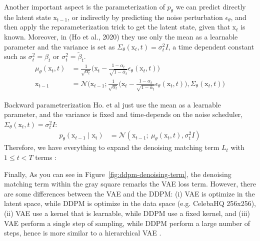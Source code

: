 \noindent {} Another important aspect is the parameterization of $p_{\theta}$ we can predict directly the latent state $\mathrm{x}_{t-1}$, or indirectly by predicting the noise perturbation $\epsilon_{\theta}$, and then apply the reparameterization trick to get the latent state, given that $\mathrm{x}_{t}$ is known. Moreover,
in (Ho et al., 2020) \cite{ho2020denoising} they use only the mean as a learnable parameter and the variance is set as $\Sigma_{\theta}(\mathrm{x}_{t}, t)=\sigma_{t}^2I$, a time dependent constant such as $\sigma_{t}^{2}=\beta_{t}$ or $\sigma_{t}^{2}=\tilde{\beta}_{t}$.
\begin{align}\label{eqn:backward-noise-reparameterization}
    \mu_{\theta}(\mathrm{x}_{t}, t) &= \frac{1}{\sqrt{\alpha_{t}}}\big(\mathrm{x}_{t} - \frac{1-\alpha_{t}}{\sqrt{1-\bar{\alpha}_{t}}}\epsilon_{\theta}(\mathrm{x}_{t}, t)\big) \\
    \mathrm{x}_{t-1} &= \mathcal{N}\big(\mathrm{x}_{t-1}; \frac{1}{\sqrt{\alpha_{t}}}\big(\mathrm{x}_{t} - \frac{1-\alpha_{t}}{\sqrt{1-\bar{\alpha}_{t}}}\epsilon_{\theta}(\mathrm{x}_{t}, t)\big), \Sigma_{\theta}(\mathrm{x}_{t}, t)\big)
\end{align}

Backward parametrerization Ho. et al just use the mean as a learnable parameter, and the variance is fixed and time-depends on the noise scheduler, 
$\Sigma_{\theta}(\mathrm{x}_{t}, t) = \sigma_{t}^{2}I$:
\begin{align}\label{eqn:backward-process-fix-variance}
    p_{\theta}(\mathrm{x}_{t-1}\mid\mathrm{x_{t}}) &= \mathcal{N}(\mathrm{x}_{t-1};~\mu_{\theta}(\mathrm{x}_{t}, t), \sigma_{t}^{2}I)
\end{align}
Therefore, we have everything to expand the denoising matching term $L_t$ with $1\leq t < T$ terms :

\noindent {} Finally, As you can see in Figure~\ref{fig:ddpm-denoising-term}, the denoising matching term within the gray square remarks the VAE loss term. However, there are some differences between the VAE and the DDPM: (i) VAE is optimize in the latent space, while DDPM is optimize in the data space (e.g. CelebaHQ 256x256), (ii) VAE use a kernel that is learnable, while DDPM use a fixed kernel, and (iii) VAE perform a single step of sampling, while DDPM perform a large number of steps, hence is more similar to a hierarchical VAE \citep{luo2022understanding}.\\


